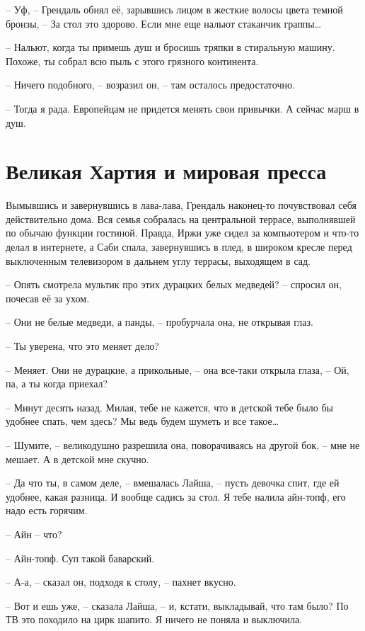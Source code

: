 -- Уф, -- Грендаль обнял её, зарывшись лицом в жесткие волосы цвета темной бронзы, -- За стол это здорово. Если мне еще нальют стаканчик граппы\ldots{}

-- Нальют, когда ты примешь душ и бросишь тряпки в стиральную машину. Похоже, ты собрал всю пыль с этого грязного континента.

-- Ничего подобного, -- возразил он, -- там осталось предостаточно.

-- Тогда я рада. Европейцам не придется менять свои привычки. А сейчас марш в душ.


\chapter{Великая Хартия и мировая пресса}

Вымывшись и завернувшись в лава-лава, Грендаль наконец-то почувствовал себя действительно дома. Вся семья собралась на центральной террасе, выполнявшей по обычаю функции гостиной. Правда, Иржи уже сидел за компьютером и что-то делал в интернете, а Саби спала, завернувшись в плед, в широком кресле перед выключенным телевизором в дальнем углу террасы, выходящем в сад.

-- Опять смотрела мультик про этих дурацких белых медведей? -- спросил он, почесав её за ухом.

-- Они не белые медведи, а панды, -- пробурчала она, не открывая глаз.

-- Ты уверена, что это меняет дело?

-- Меняет. Они не дурацкие, а прикольные, -- она все-таки открыла глаза, -- Ой, па, а ты когда приехал?

-- Минут десять назад. Милая, тебе не кажется, что в детской тебе было бы удобнее спать, чем здесь? Мы ведь будем шуметь и все такое\ldots{}

-- Шумите, -- великодушно разрешила она, поворачиваясь на другой бок, -- мне не мешает. А в детской мне скучно.

-- Да что ты, в самом деле, -- вмешалась Лайша, -- пусть девочка спит, где ей удобнее, какая разница. И вообще садись за стол. Я тебе налила айн-топф, его надо есть горячим.

-- Айн -- что?

-- Айн-топф. Суп такой баварский.

-- А-а, -- сказал он, подходя к столу, -- пахнет вкусно.

-- Вот и ешь уже, -- сказала Лайша, -- и, кстати, выкладывай, что там было? По ТВ это походило на цирк шапито. Я ничего не поняла и выключила.

